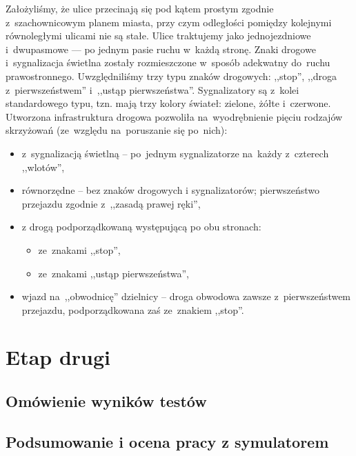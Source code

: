 \documentclass[11pt, a4paper, twoside]{report}
\begin{document}
Założyliśmy, że ulice przecinają się pod kątem prostym zgodnie z~szachownicowym planem miasta, przy czym odległości pomiędzy kolejnymi równoległymi ulicami nie są stałe. Ulice traktujemy jako jednojezdniowe i~dwupasmowe --- po jednym pasie ruchu w~każdą stronę. Znaki drogowe i~sygnalizacja świetlna zostały rozmieszczone w~sposób adekwatny do~ruchu prawostronnego. Uwzględniliśmy trzy typu znaków drogowych: ,,stop'', ,,droga z~pierwszeństwem'' i~,,ustąp pierwszeństwa''. Sygnalizatory są z~kolei standardowego typu, tzn. mają trzy kolory świateł: zielone, żółte i~czerwone. Utworzona infrastruktura drogowa pozwoliła na~wyodrębnienie pięciu rodzajów skrzyżowań (ze~względu na~poruszanie się po~nich):
\begin{itemize}
	\item z~sygnalizacją świetlną -- po~jednym sygnalizatorze na~każdy z~czterech ,,wlotów'',
	\item równorzędne -- bez znaków drogowych i sygnalizatorów; pierwszeństwo przejazdu zgodnie z~,,zasadą prawej ręki'',
	\item z drogą podporządkowaną występującą po obu stronach:
	\begin{itemize}
		\item ze~znakami ,,stop'',
		\item ze~znakami ,,ustąp pierwszeństwa'',
	\end{itemize}
	\item wjazd na~,,obwodnicę'' dzielnicy -- droga obwodowa zawsze z~pierwszeństwem przejazdu, podporządkowana zaś ze~znakiem ,,stop''.
\end{itemize}






\chapter{Etap drugi}
\section{Omówienie wyników testów}
\label{sec:Wyniki}

\section{Podsumowanie i ocena pracy z symulatorem}
	
	
	
	
		
\end{document}
